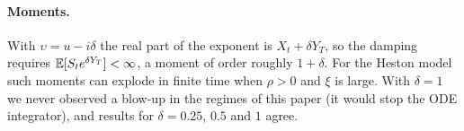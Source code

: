 \paragraph{Moments.} With $\upsilon = u-i\delta$ the real part of the exponent is $X_t+\delta Y_T$, so the
damping requires $\mathbb{E}[S_te^{\delta Y_T}]<\infty$, a moment of order roughly $1+\delta$. For the Heston model
such moments can explode in finite time when $\rho>0$ and $\xi$ is large. With $\delta=1$ we never observed
a blow-up in the regimes of this paper (it would stop the ODE integrator), and results for
$\delta=0.25$, $0.5$ and $1$ agree.
